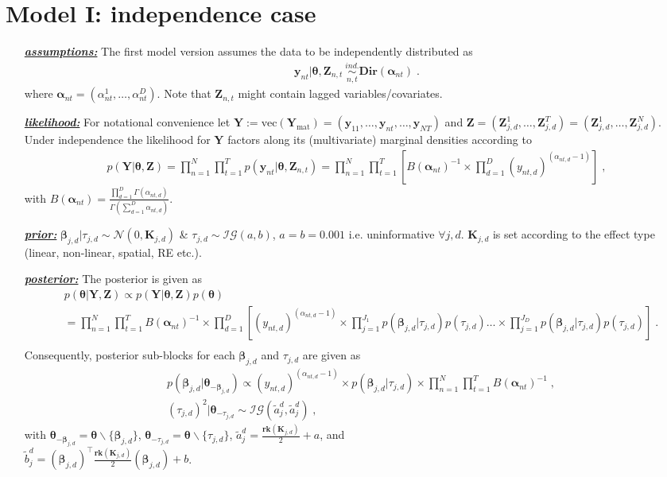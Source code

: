 \documentclass[a4paper,12pt]{scrartcl} %
\newcommand{\bs}{\boldsymbol}  %
\newcommand{\pt}{\propto}
\newcommand{\Ant}{\bs{\alpha}_{nt}}
\newcommand{\ant}[1]{\alpha_{nt}^{#1}}
\newcommand{\antd}{\alpha_{nt,d}}
\newcommand{\bjd}{\bs{\beta}_{j,d}}
\newcommand{\ts}{\bs{\theta}}
\newcommand{\tjd}{\tau_{j,d}}
\newcommand{\Znt}{\bs{Z}_{n,t}}
\newcommand{\ZJD}[1]{\bs{Z}_{j,d}^{#1}}
\newcommand{\Z}{\bs{Z}}
\newcommand{\Kjd}{\bs{K}_{j,d}}
\newcommand{\ynt}{\bs{y}_{nt}}
\newcommand{\yntd}{y_{nt,d}}
\newcommand{\Y}{\bs{Y}}
\newcommand{\vY}{\text{vec}(\bs{Y}_{\text{mat}})}
\newcommand{\Dir}{\textbf{Dir}}
\newcommand{\sumd}{\sum_{d=1}^D}
\newcommand{\prodd}{\prod_{d=1}^D}
\newcommand{\prodt}{\prod_{t=1}^T}
\newcommand{\prodn}{\prod_{n=1}^{N}}
\newcommand{\prodJ}[1]{\prod_{j=1}^{J_{#1}}}
\begin{document}
\section{Model I: independence case}
\begin{itemize}
\item[\underline{\textbf{\textit{assumptions:}}}] The first model version assumes the data to be independently distributed as
\begin{align*}
\ynt | \ts,\Znt ~ \underset{n,t}{\overset{ind.}{\sim}} \Dir(\Ant)\;.
\end{align*}
where $\Ant=\left(\ant{1},\ldots,\ant{D}\right)$. Note that $\Znt$ might contain lagged variables/covariates.
\item[]
\item[\underline{\textbf{\textit{likelihood:}}}] For notational convenience let  $\Y:=\vY=\left(\bs{y}_{11},\ldots,\ynt,\ldots,\bs{y}_{NT}\right)$ and $\Z =\left(\ZJD{1},\ldots,\ZJD{T}\right)=\left(\ZJD{1},\ldots,\ZJD{N}\right)$. Under independence the likelihood for $\bs{Y}$ factors along its (multivariate) marginal densities according to
\begin{align*}
p(\bs{Y}|\ts,\Z)=\prodn\prodt p(\ynt|\ts,\Znt)=\prodn\prodt \left[ B(\Ant)^{-1}\times\prodd (\yntd)^{(\antd-1)}\right]\;,
\end{align*}
with $B(\Ant)=\frac{\prod_{d=1}^D\Gamma(\antd)}{\Gamma\left(\sumd \antd\right)}$.
\item[]
\item[\underline{\textbf{\textit{prior:}}}] $\bjd | \tjd \sim \mathcal{N}(0,\Kjd)$ \& $\tjd \sim \mathcal{IG}(a,b)$, $a=b=0.001$ i.e. uninformative $\forall j,d$. $\Kjd$ is set according to the effect type (linear, non-linear, spatial, RE etc.). 
\item[\underline{\textbf{\textit{posterior:}}}] The posterior is given as
\begin{align*}
&p(\ts|\bs{Y},\Z)\pt p(\bs{Y}|\ts,\Z)p(\ts)\\
&=\prodn\prodt B(\Ant)^{-1}\times \prodd \left[(\yntd)^{(\antd-1)} 
\times \prodJ{1} p\left(\bjd | \tjd\right) p\left(\tjd\right) \ldots \times \prodJ{D} p\left(\bjd | \tjd\right) p\left(\tjd\right)
\right]\;. \\
\end{align*}
Consequently, posterior sub-blocks for each $\bjd$ and $\tjd$ are given as
\begin{align*}
&p\left(\bjd|\ts_{-\bjd}\right)\pt (\yntd)^{(\antd-1)} \times p\left(\bjd | \tjd\right) \times \prodn\prodt B(\Ant)^{-1}\;,\\
&(\tjd)^2|\ts_{-\tjd}\sim \mathcal{IG}(\tilde{a}_j^d,\tilde{a}_j^d)\;,
\end{align*}
with $\ts_{-\bjd}=\ts \backslash \{\bjd\}$, $\ts_{-\tjd}=\ts \backslash \{\tjd\}$,  $\tilde{a}_j^d=\frac{\textbf{rk}(\Kjd)}{2} + a$, and \\ $\tilde{b}_j^d=(\bjd)^{\top}\frac{\textbf{rk}(\Kjd)}{2} (\bjd) + b$.
\end{itemize}
\clearpage
%
%
%
%
%
%
\end{document}
